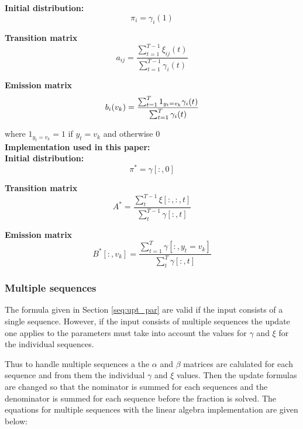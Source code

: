 \textbf{Initial distribution:}
\begin{equation}
    \pi_i = \gamma_i(1)
\end{equation}

\textbf{Transition matrix}
\begin{equation}
    a_{ij} = \frac{\sum_{t=1}^{T-1} \xi_{ij}(t)} {\sum_{t=1}^{T-1} \gamma_i(t)}
\end{equation}

\textbf{Emission matrix}
\begin{equation}
    b_i(v_k) = \frac{\sum_{t=1}^T 1_{y_t=v_k} \gamma_i(t)}{\sum_{t=1}^T \gamma_i(t)} \\
\end{equation}

where $1_{y_t=v_k} = 1$ if ${y_t=v_k}$ and otherwise 0\\

\noindent
\textbf{Implementation used in this paper:}\\

\textbf{Initial distribution:}
\begin{equation}
    \pi^* = \gamma[:,0]
\end{equation}

\textbf{Transition matrix}
\begin{equation}
    A^* = \frac{\sum_t^{T-1} \xi[:,:,t]}{\sum_t^{T-1} \gamma[:,t]} 
\end{equation}

\textbf{Emission matrix}
\begin{equation}
    B^*[:,v_k] =  \frac{\sum_{t=1}^{T} \gamma[:,y_t=v_k]}{\sum_t^{T} \gamma[:,t]}
\end{equation}

\subsubsection{Multiple sequences}
The formula given in Section \ref{seq:upt_par} are valid if the input consists of a single sequence. However, if the input consists of multiple sequences the update one applies to the parameters must take into account the values for $\gamma$ and $\xi$ for the individual sequences. 

Thus to handle multiple sequences a the $\alpha$ and $\beta$ matrices are calulated for each sequence and from them the individual $\gamma$ and $\xi$ values. Then the update formulas are changed so that the nominator is summed for each sequences and the denominator is summed for each sequence before the fraction is solved. The equations for multiple sequences with the linear algebra implementation are given below: \\

